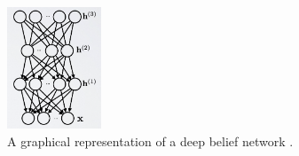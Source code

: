 \begin{figure}
    \centering
    \includegraphics[width=0.25\textwidth]{Images/DBN graphical.png}
    \caption[DBN graphically represented.]{A graphical representation of a deep belief network \cite{hugo_larochelle_neural_2013}.}
    \label{fig:dbnhugo}
\end{figure}


